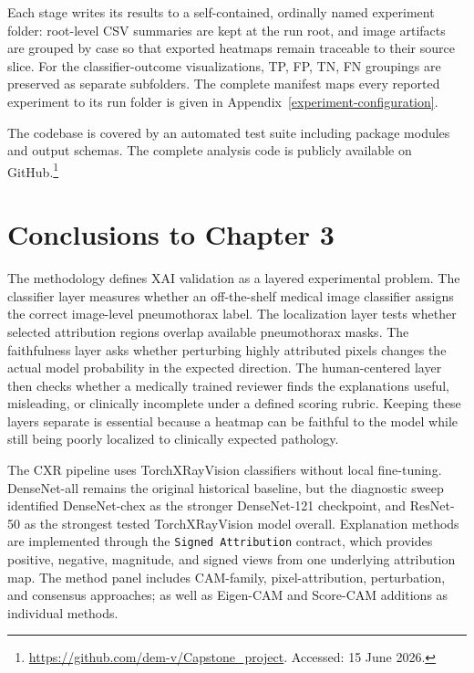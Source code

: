 Each stage writes its results to a self-contained, ordinally named
experiment folder: root-level CSV summaries are kept at the run root,
and image artifacts are grouped by case so that exported heatmaps remain
traceable to their source slice. For the classifier-outcome
visualizations, TP, FP, TN, FN groupings are preserved as separate subfolders. The
complete manifest maps every reported experiment to its run folder
is given in Appendix~\ref{experiment-configuration}.

The codebase is covered by an automated test suite including 
package modules and output schemas. The complete analysis code is
publicly available on GitHub.\footnote{\url{https://github.com/dem-v/Capstone_project}.
Accessed: 15 June 2026.}

\hypertarget{conclusions-to-chapter-3}{%
	\section*{Conclusions to Chapter 3}\label{conclusions-to-chapter-3}}

The methodology defines XAI validation as a layered experimental problem. 
The classifier layer
measures whether an off-the-shelf medical image classifier assigns the
correct image-level pneumothorax label. The localization layer tests
whether selected attribution regions overlap available pneumothorax
masks. The faithfulness layer asks whether perturbing highly attributed
pixels changes the actual model probability in the expected direction.
The human-centered layer then checks whether a medically trained
reviewer finds the explanations useful, misleading, or clinically
incomplete under a defined scoring rubric. Keeping these layers separate
is essential because a heatmap can be faithful to the model while still
being poorly localized to clinically expected pathology.

The CXR pipeline uses TorchXRayVision classifiers without local
fine-tuning. DenseNet-all remains the original historical 
baseline, but the diagnostic sweep identified DenseNet-chex as
the stronger DenseNet-121 checkpoint, and ResNet-50 as the strongest
tested TorchXRayVision model overall. Explanation methods are
implemented through the \texttt{Signed Attribution} contract, which
provides positive, negative, magnitude, and signed views from one
underlying attribution map. The method panel includes CAM-family,
pixel-attribution, perturbation, and consensus approaches; as well as 
Eigen-CAM and Score-CAM additions as individual methods.

